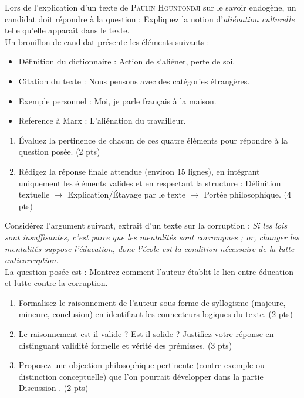 \documentclass[11pt]{article}
\begin{document}
\begin{exercice}
Lors de l'explication d'un texte de \textsc{Paulin Hountondji} sur le savoir endogène, un candidat doit répondre à la question : \og Expliquez la notion d'\textit{aliénation culturelle} telle qu'elle apparaît dans le texte. \fg{} \\
Un brouillon de candidat présente les éléments suivants :
\begin{itemize}
    \item Définition du dictionnaire : \og Action de s'aliéner, perte de soi. \fg{}
    \item Citation du texte : \og Nous pensons avec des catégories étrangères. \fg{}
    \item Exemple personnel : \og Moi, je parle français à la maison. \fg{}
    \item Reference à Marx : \og L'aliénation du travailleur. \fg{}
\end{itemize}
\begin{enumerate}
    \item Évaluez la pertinence de chacun de ces quatre éléments pour répondre à la question posée. (2 pts)
    \item Rédigez la réponse finale attendue (environ 15 lignes), en intégrant uniquement les éléments valides et en respectant la structure : Définition textuelle $\rightarrow$ Explication/Étayage par le texte $\rightarrow$ Portée philosophique. (4 pts)
\end{enumerate}
\end{exercice}

\begin{exercice}
Considérez l'argument suivant, extrait d'un texte sur la corruption : \og \textit{Si les lois sont insuffisantes, c'est parce que les mentalités sont corrompues ; or, changer les mentalités suppose l'éducation, donc l'école est la condition nécessaire de la lutte anticorruption.} \fg{} \\
La question posée est : \og Montrez comment l'auteur établit le lien entre éducation et lutte contre la corruption. \fg{}
\begin{enumerate}
    \item Formalisez le raisonnement de l'auteur sous forme de syllogisme (majeure, mineure, conclusion) en identifiant les connecteurs logiques du texte. (2 pts)
    \item Le raisonnement est-il valide ? Est-il solide ? Justifiez votre réponse en distinguant validité formelle et vérité des prémisses. (3 pts)
    \item Proposez une objection philosophique pertinente (contre-exemple ou distinction conceptuelle) que l'on pourrait développer dans la partie \og Discussion \fg{}. (2 pts)
\end{enumerate}
\end{exercice}
\end{document}
